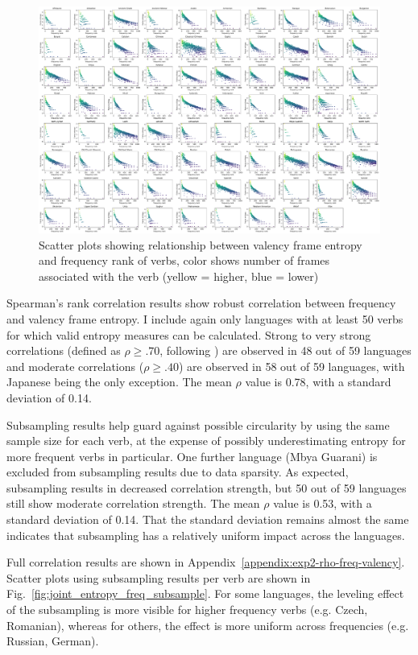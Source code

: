 \begin{figure}
  \centering
  \includegraphics[width=\textwidth]{figures/exp2/joint_entropy_freq.pdf}
  \caption{Scatter plots showing relationship between valency frame entropy and frequency rank of verbs, color shows number of frames associated with the verb (yellow = higher, blue = lower)}
  \label{fig:joint_entropy_freq}
\end{figure}

Spearman's rank correlation results show robust correlation between frequency and valency frame entropy. I include again only languages with at least 50 verbs for which valid entropy measures can be calculated. Strong to very strong correlations (defined as $\rho\geq.70$, following \citealp{schober2018}) are observed in 48 out of 59 languages and moderate correlations ($\rho\geq.40$) are observed in 58 out of 59 languages, with Japanese being the only exception.  The mean $\rho$ value is 0.78, with a standard deviation of 0.14.

Subsampling results help guard against possible circularity by using the same sample size for each verb, at the expense of possibly underestimating entropy for more frequent verbs in particular. One further language (Mbya Guarani) is excluded from subsampling results due to data sparsity. As expected, subsampling results in decreased correlation strength, but 50 out of 59 languages still show moderate correlation strength. The mean $\rho$ value is 0.53, with a standard deviation of 0.14. That the standard deviation remains almost the same indicates that subsampling has a relatively uniform impact across the languages.

Full correlation results are shown in Appendix~\ref{appendix:exp2-rho-freq-valency}. Scatter plots using subsampling results per verb are shown in Fig.~\ref{fig:joint_entropy_freq_subsample}. For some languages, the leveling effect of the subsampling is more visible for higher frequency verbs (e.g. Czech, Romanian), whereas for others, the effect is more uniform across frequencies (e.g. Russian, German).

